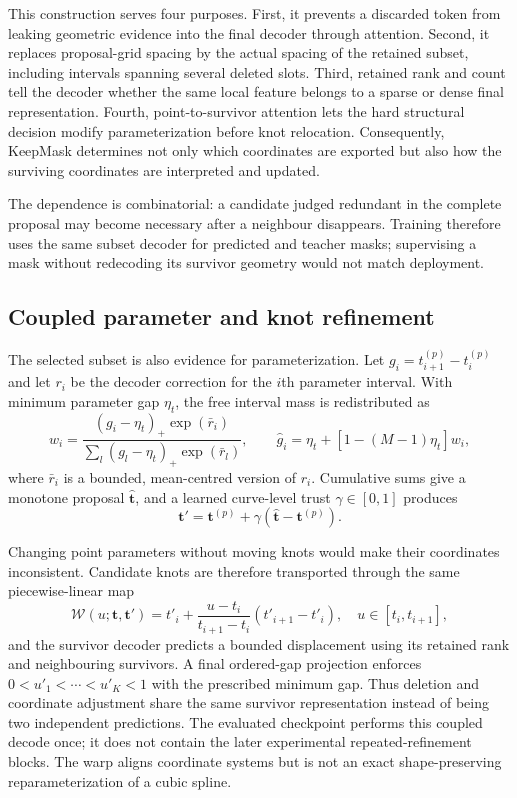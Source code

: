 \documentclass[preprint,12pt]{elsarticle}
\begin{document}
This construction serves four purposes. First, it prevents a discarded token
from leaking geometric evidence into the final decoder through attention.
Second, it replaces proposal-grid spacing by the actual spacing of the retained
subset, including intervals spanning several deleted slots. Third, retained
rank and count tell the decoder whether the same local feature belongs to a
sparse or dense final representation. Fourth, point-to-survivor attention lets
the hard structural decision modify parameterization before knot relocation.
Consequently, KeepMask determines not only which coordinates are exported but
also how the surviving coordinates are interpreted and updated.

The dependence is combinatorial: a candidate judged redundant in the complete
proposal may become necessary after a neighbour disappears. Training therefore
uses the same subset decoder for predicted and teacher masks; supervising a
mask without redecoding its survivor geometry would not match deployment.

\subsection{Coupled parameter and knot refinement}
The selected subset is also evidence for parameterization. Let
$g_i=t^{(p)}_{i+1}-t^{(p)}_i$ and let $r_i$ be the decoder correction for the
$i$th parameter interval. With minimum parameter gap $\eta_t$, the free
interval mass is redistributed as
\begin{equation}
w_i=\frac{(g_i-\eta_t)_+\exp(\bar r_i)}
{\sum_l(g_l-\eta_t)_+\exp(\bar r_l)},\qquad
\widehat g_i=\eta_t+[1-(M-1)\eta_t]w_i,
\end{equation}
where $\bar r_i$ is a bounded, mean-centred version of $r_i$. Cumulative sums
give a monotone proposal $\widehat{\bm t}$, and a learned curve-level trust
$\gamma\in[0,1]$ produces
\begin{equation}
\bm t'=\bm t^{(p)}+\gamma(\widehat{\bm t}-\bm t^{(p)}).
\end{equation}

Changing point parameters without moving knots would make their coordinates
inconsistent. Candidate knots are therefore transported through the same
piecewise-linear map
\begin{equation}
 \mathcal W(u;\bm t,\bm t')=
 t'_i+\frac{u-t_i}{t_{i+1}-t_i}(t'_{i+1}-t'_i),
 \quad u\in[t_i,t_{i+1}],
\end{equation}
and the survivor decoder predicts a bounded displacement using its retained
rank and neighbouring survivors. A final ordered-gap projection enforces
$0<u'_1<\cdots<u'_K<1$ with the prescribed minimum gap. Thus deletion and
coordinate adjustment share the same survivor representation instead of being
two independent predictions. The evaluated checkpoint performs this coupled
decode once; it does not contain the later experimental repeated-refinement
blocks. The warp aligns coordinate systems but is not an exact
shape-preserving reparameterization of a cubic spline.
\end{document}
